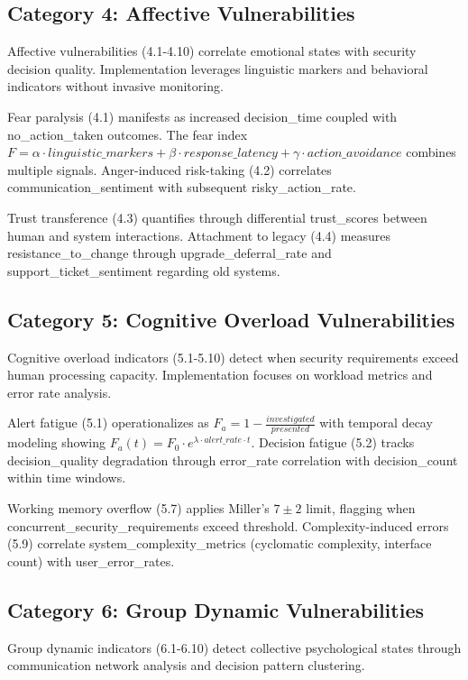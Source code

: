 \documentclass[10pt, twocolumn]{article}
\begin{document}
\subsection{Category 4: Affective Vulnerabilities}

Affective vulnerabilities (4.1-4.10) correlate emotional states with security decision quality. Implementation leverages linguistic markers and behavioral indicators without invasive monitoring.

Fear paralysis (4.1) manifests as increased decision\_time coupled with no\_action\_taken outcomes. The fear index $F = \alpha \cdot linguistic\_markers + \beta \cdot response\_latency + \gamma \cdot action\_avoidance$ combines multiple signals. Anger-induced risk-taking (4.2) correlates communication\_sentiment with subsequent risky\_action\_rate.

Trust transference (4.3) quantifies through differential trust\_scores between human and system interactions. Attachment to legacy (4.4) measures resistance\_to\_change through upgrade\_deferral\_rate and support\_ticket\_sentiment regarding old systems.

\subsection{Category 5: Cognitive Overload Vulnerabilities}

Cognitive overload indicators (5.1-5.10) detect when security requirements exceed human processing capacity. Implementation focuses on workload metrics and error rate analysis.

Alert fatigue (5.1) operationalizes as $F_a = 1 - \frac{investigated}{presented}$ with temporal decay modeling showing $F_a(t) = F_0 \cdot e^{\lambda \cdot alert\_rate \cdot t}$. Decision fatigue (5.2) tracks decision\_quality degradation through error\_rate correlation with decision\_count within time windows.

Working memory overflow (5.7) applies Miller's $7\pm2$ limit, flagging when concurrent\_security\_requirements exceed threshold. Complexity-induced errors (5.9) correlate system\_complexity\_metrics (cyclomatic complexity, interface count) with user\_error\_rates.

\subsection{Category 6: Group Dynamic Vulnerabilities}

Group dynamic indicators (6.1-6.10) detect collective psychological states through communication network analysis and decision pattern clustering.
\end{document}
